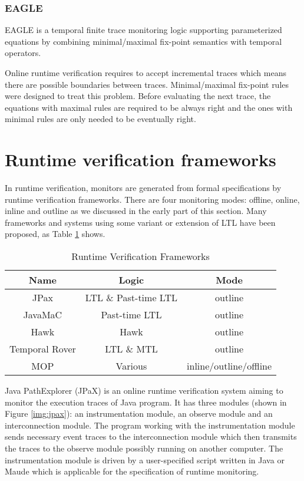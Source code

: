 \subsubsection{EAGLE}

EAGLE \citep{barringer2004rule} is a temporal finite trace monitoring logic supporting parameterized equations by combining minimal/maximal fix-point semantics with temporal operators.

Online runtime verification requires to accept incremental traces which means there are possible boundaries between traces. Minimal/maximal fix-point rules were designed to treat this problem. Before evaluating the next trace, the equations with maximal rules are required to be always right and the ones with minimal rules are only needed to be eventually right.

\section{Runtime verification frameworks}\label{sec:rv:frameworks}

In runtime verification, monitors are generated from formal specifications by runtime verification frameworks. There are four monitoring modes: offline, online, inline and outline as we discussed in the early part of this section. Many frameworks and systems using some variant or extension of LTL have been proposed, as Table \ref{table:rvframeworks} shows. 

\begin{table}[h]
\centering
\begin{tabular}{|c|c|c|}
\hline
Name & Logic & Mode \\
\hline
JPax\citep{havelund2001java} & LTL \& Past-time LTL & outline \\
\hline
JavaMaC\citep{kim2004java} & Past-time LTL & outline \\
\hline
Hawk \citep{d2005event} & Hawk & outline \\
\hline
Temporal Rover\citep{drusinsky2000temporal} & LTL \& MTL & outline \\
\hline
MOP \citep{chen2007mop} & Various & inline/outline/offline \\
\hline
\end{tabular}
\caption{Runtime Verification Frameworks}
\label{table:rvframeworks}
\end{table}

Java PathExplorer (JPaX) \citep{havelund2001java} is an online runtime verification system aiming to monitor the execution traces of Java program. It has three modules (shown in Figure \ref{img:jpax}): an instrumentation module, an observe module and an interconnection module. The program working with the instrumentation module sends necessary event traces to the interconnection module which then transmits the traces to the observe module possibly running on another computer. The instrumentation module is driven by a user-specified script written in Java or Maude which is applicable for the specification of runtime monitoring.

